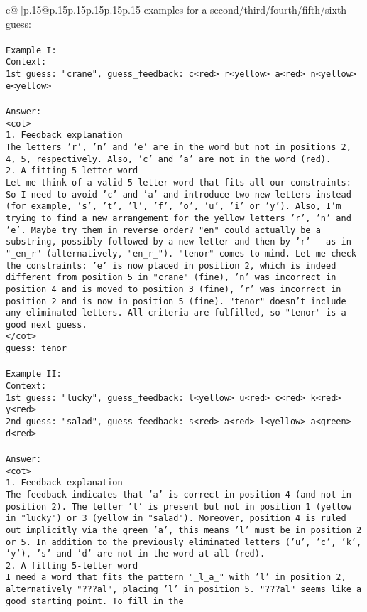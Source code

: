 \documentclass{article}
\begin{document}
{\begin{supertabular}{c@{$\;$}|p{.15\linewidth}@{}p{.15\linewidth}p{.15\linewidth}p{.15\linewidth}p{.15\linewidth}p{.15\linewidth}}
{{{examples for a second/third/fourth/fifth/sixth guess:\\ \tt \\ \tt Example I:\\ \tt Context:\\ \tt 1st guess: "crane", guess_feedback: c<red> r<yellow> a<red> n<yellow> e<yellow>\\ \tt \\ \tt Answer:\\ \tt <cot>\\ \tt 1. Feedback explanation\\ \tt The letters 'r', 'n' and 'e' are in the word but not in positions 2, 4, 5, respectively. Also, 'c' and 'a' are not in the word (red).\\ \tt 2. A fitting 5-letter word\\ \tt Let me think of a valid 5-letter word that fits all our constraints: So I need to avoid 'c' and 'a' and introduce two new letters instead (for example, 's', 't', 'l', 'f', 'o', 'u', 'i' or 'y'). Also, I'm trying to find a new arrangement for the yellow letters 'r', 'n' and 'e'. Maybe try them in reverse order? "en" could actually be a substring, possibly followed by a new letter and then by 'r' — as in "_en_r" (alternatively, "en_r_"). "tenor" comes to mind. Let me check the constraints: 'e' is now placed in position 2, which is indeed different from position 5 in "crane" (fine), 'n' was incorrect in position 4 and is moved to position 3 (fine), 'r' was incorrect in position 2 and is now in position 5 (fine). "tenor" doesn't include any eliminated letters. All criteria are fulfilled, so "tenor" is a good next guess.\\ \tt </cot>\\ \tt guess: tenor\\ \tt \\ \tt Example II:\\ \tt Context:\\ \tt 1st guess: "lucky", guess_feedback: l<yellow> u<red> c<red> k<red> y<red>\\ \tt 2nd guess: "salad", guess_feedback: s<red> a<red> l<yellow> a<green> d<red>\\ \tt \\ \tt Answer:\\ \tt <cot>\\ \tt 1. Feedback explanation\\ \tt The feedback indicates that 'a' is correct in position 4 (and not in position 2). The letter 'l' is present but not in position 1 (yellow in "lucky") or 3 (yellow in "salad"). Moreover, position 4 is ruled out implicitly via the green 'a', this means 'l' must be in position 2 or 5. In addition to the previously eliminated letters ('u', 'c', 'k', 'y'), 's' and 'd' are not in the word at all (red).\\ \tt 2. A fitting 5-letter word\\ \tt I need a word that fits the pattern "_l_a_" with 'l' in position 2, alternatively "???al", placing 'l' in position 5. "???al" seems like a good starting point. To fill in the }}}
\end{supertabular}}
\end{document}
